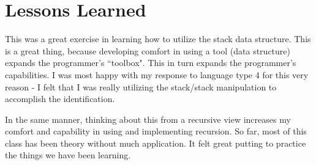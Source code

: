 \documentclass[12pt, titlepage]{article}
\begin{document}
\section{Lessons Learned}

This was a great exercise in learning how to utilize the stack data structure. This is a great thing, because developing comfort in using a tool (data structure) expands the programmer's ``toolbox". This in turn expands the programmer's capabilities. I was most happy with my response to language type 4 for this very reason - I felt that I was really utilizing the stack/stack manipulation to accomplish the identification. 

In the same manner, thinking about this from a recursive view increases my comfort and capability in using and implementing recursion. So far, most of this class has been theory without much application. It felt great putting to practice the things we have been learning.
\end{document}
